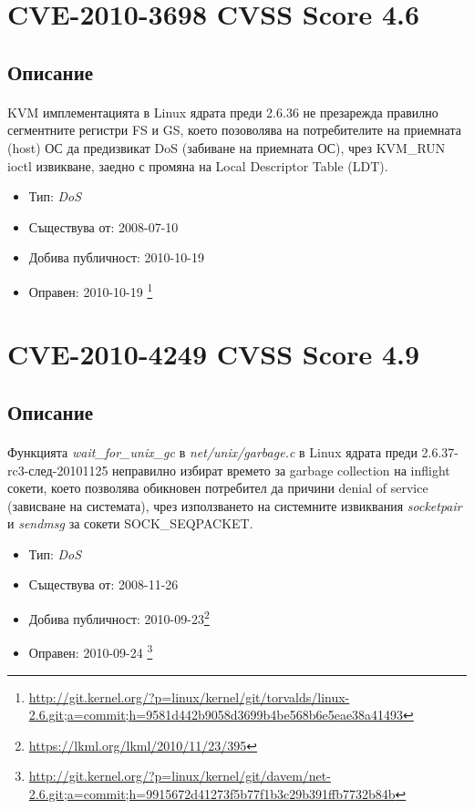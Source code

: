 \documentclass[a4paper,12pt,leqno]{article}
\begin{document}
\section{CVE-2010-3698 CVSS Score 4.6}
\subsection{Описание}
\paragraph{}
KVM имплементацията в Linux ядрата преди 2.6.36 не презарежда правилно сегментните регистри FS и GS, което позоволява на потребителите на приемната (host) ОС да предизвикат DoS (забиване на приемната ОС), чрез KVM\_RUN ioctl извикване, заедно с промяна на Local Descriptor Table (LDT).

\begin{itemize}
    \item Тип: \textit{DoS}
    \item Съществува от: 2008-07-10
  	\item Добива публичност: 2010-10-19
    \item Оправен: 2010-10-19 \footnote{\url{http://git.kernel.org/?p=linux/kernel/git/torvalds/linux-2.6.git;a=commit;h=9581d442b9058d3699b4be568b6e5eae38a41493}}
\end{itemize}


\section{CVE-2010-4249 CVSS Score 4.9}
\subsection{Описание}
\paragraph{}
Функцията \textit{wait\_for\_unix\_gc} в \textit{net/unix/garbage.c} в Linux ядрата преди 2.6.37-rc3-след-20101125 неправилно избират времето за garbage collection на inflight сокети, което позволява обикновен потребител да причини denial of service (зависване на системата), чрез използването на системните извиквания \textit{socketpair} и \textit{sendmsg} за сокети SOCK\_SEQPACKET.

\begin{itemize}
    \item Тип: \textit{DoS}
    \item Съществува от: 2008-11-26
  	\item Добива публичност: 2010-09-23\footnote{\url{https://lkml.org/lkml/2010/11/23/395}}
    \item Оправен: 2010-09-24 \footnote{\url{http://git.kernel.org/?p=linux/kernel/git/davem/net-2.6.git;a=commit;h=9915672d41273f5b77f1b3c29b391ffb7732b84b}}
\end{itemize}
\end{document}
